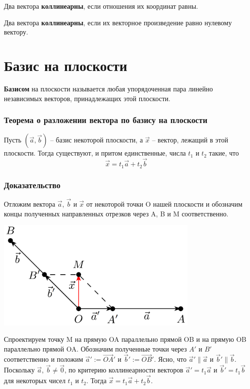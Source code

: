\documentclass[a4paper]{article}
\begin{document}
{\begin{small}
Два вектора \textbf{коллинеарны}, если отношения их координат равны.

Два вектора \textbf{коллинеарны}, если их векторное произведение равно нулевому вектору.

\section*{Базис на плоскости}
\textbf{Базисом} на плоскости называется любая упорядоченная пара линейно независимых векторов, принадлежащих этой плоскости. 

\subsubsection*{Теорема о разложении вектора по базису на плоскости}

Пусть $(\vec{a},\vec{b})$ – базис некоторой плоскости, а $\vec{x}$ – вектор, лежащий в этой
плоскости. Тогда существуют, и притом единственные, числа $t_1$ и $t_2$ такие,
что
\begin{equation}
\vec{x} = t_1 \vec{a} + t_2 \vec{b}
\end{equation}

\subsubsection*{Доказательство}
Отложим вектора $\vec{a}$, $\vec{b}$ и $\vec{x}$ от некоторой точки O нашей
плоскости и обозначим концы полученных направленных отрезков через A, B и M соответственно.

\includegraphics[width=10cm]{t1}

Спроектируем точку M на прямую OA параллельно прямой OB и на прямую OB параллельно прямой OA. Обозначим полученные точки через $A'$ и $B'$ соответственно и положим  $\vec{a}' := \overrightarrow{OA}'$ и $\vec{b}' := \overrightarrow{OB}'$. Ясно, что $\vec{a}' \parallel \vec{a}$ и $\vec{b}' \parallel \vec{b}$. Поскольку $\vec{a}$, $\vec{b} \neq \vec{0}$, по критерию коллинеарности векторов $\vec{a}' = t_1 \vec{a}$ и $\vec{b}' = t_1 \vec{b}$ для некоторых чисел $t_1$ и $t_2$.
Тогда $\vec{x} = t_1 \vec{a} + t_2 \vec{b}$.


\end{small}}
\end{document}
